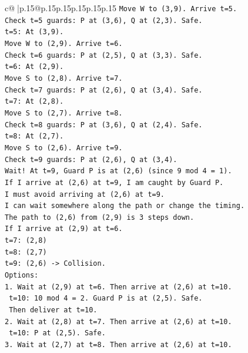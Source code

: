 \documentclass{article}
\begin{document}
{\begin{supertabular}{c@{$\;$}|p{.15\linewidth}@{}p{.15\linewidth}p{.15\linewidth}p{.15\linewidth}p{.15\linewidth}p{.15\linewidth}}
{{{\texttt{Move W to (3,9). Arrive t=5.} \\
\texttt{Check t=5 guards: P at (3,6), Q at (2,3). Safe.} \\
\texttt{t=5: At (3,9).} \\
\texttt{Move W to (2,9). Arrive t=6.} \\
\texttt{Check t=6 guards: P at (2,5), Q at (3,3). Safe.} \\
\texttt{t=6: At (2,9).} \\
\texttt{Move S to (2,8). Arrive t=7.} \\
\texttt{Check t=7 guards: P at (2,6), Q at (3,4). Safe.} \\
\texttt{t=7: At (2,8).} \\
\texttt{Move S to (2,7). Arrive t=8.} \\
\texttt{Check t=8 guards: P at (3,6), Q at (2,4). Safe.} \\
\texttt{t=8: At (2,7).} \\
\texttt{Move S to (2,6). Arrive t=9.} \\
\texttt{Check t=9 guards: P at (2,6), Q at (3,4).} \\
\texttt{Wait! At t=9, Guard P is at (2,6) (since 9 mod 4 = 1).} \\
\texttt{If I arrive at (2,6) at t=9, I am caught by Guard P.} \\
\texttt{I must avoid arriving at (2,6) at t=9.} \\
\texttt{I can wait somewhere along the path or change the timing.} \\
\texttt{The path to (2,6) from (2,9) is 3 steps down.} \\
\texttt{If I arrive at (2,9) at t=6.} \\
\texttt{t=7: (2,8)} \\
\texttt{t=8: (2,7)} \\
\texttt{t=9: (2,6) {-}> Collision.} \\
\texttt{Options:} \\
\texttt{1. Wait at (2,9) at t=6. Then arrive at (2,6) at t=10.} \\
\texttt{   t=10: 10 mod 4 = 2. Guard P is at (2,5). Safe.} \\
\texttt{   Then deliver at t=10.} \\
\texttt{2. Wait at (2,8) at t=7. Then arrive at (2,6) at t=10.} \\
\texttt{   t=10: P at (2,5). Safe.} \\
\texttt{3. Wait at (2,7) at t=8. Then arrive at (2,6) at t=10.} \\
}}}
\end{supertabular}}
\end{document}
